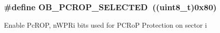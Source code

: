 \subsubsection[{\texorpdfstring{O\+B\+\_\+\+P\+C\+R\+O\+P\+\_\+\+S\+E\+L\+E\+C\+T\+ED}{OB_PCROP_SELECTED}}]{\setlength{\rightskip}{0pt plus 5cm}\#define O\+B\+\_\+\+P\+C\+R\+O\+P\+\_\+\+S\+E\+L\+E\+C\+T\+ED~((uint8\+\_\+t)0x80)}\hypertarget{group___f_l_a_s_h_ex___selection___protection___mode_ga7de2d3d5fc3baa922d43850a2f140dfc}{}\label{group___f_l_a_s_h_ex___selection___protection___mode_ga7de2d3d5fc3baa922d43850a2f140dfc}
Enable Pc\+R\+OP, n\+W\+P\+Ri bits used for P\+C\+RoP Protection on sector i 